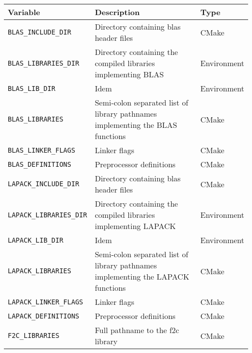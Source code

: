 \renewcommand{\arraystretch}{1.3}
\gdef\lcTabularBorder{2}
\begin{tabular}{|l|l|l|} \hline
  \textbf{Variable}               & \textbf{Description}                                                             & \textbf{Type}\\\hline\hline
  \texttt{BLAS\_INCLUDE\_DIR}     & Directory containing blas header files                                           & CMake\\\hline
  \texttt{BLAS\_LIBRARIES\_DIR}   & Directory containing the compiled libraries implementing BLAS                    & Environment\\\hline
  \texttt{BLAS\_LIB\_DIR}         & Idem                                                                             & Environment\\\hline
  \texttt{BLAS\_LIBRARIES}        & Semi-colon separated list of library pathnames implementing the BLAS functions   & CMake\\\hline
  \texttt{BLAS\_LINKER\_FLAGS}    & Linker flags                                                                     & CMake\\\hline
  \texttt{BLAS\_DEFINITIONS}      & Preprocessor definitions                                                         & CMake\\\hline
  \texttt{LAPACK\_INCLUDE\_DIR}   & Directory containing blas header files                                           & CMake\\\hline
  \texttt{LAPACK\_LIBRARIES\_DIR} & Directory containing the compiled libraries implementing LAPACK                  & Environment\\\hline
  \texttt{LAPACK\_LIB\_DIR}       & Idem                                                                             & Environment\\\hline
  \texttt{LAPACK\_LIBRARIES}      & Semi-colon separated list of library pathnames implementing the LAPACK functions & CMake\\\hline
  \texttt{LAPACK\_LINKER\_FLAGS}  & Linker flags                                                                     & CMake\\\hline
  \texttt{LAPACK\_DEFINITIONS}    & Preprocessor definitions                                                         & CMake\\\hline
  \texttt{F2C\_LIBRARIES}         & Full pathname to the f2c library                                                 & CMake\\\hline
\end{tabular}

